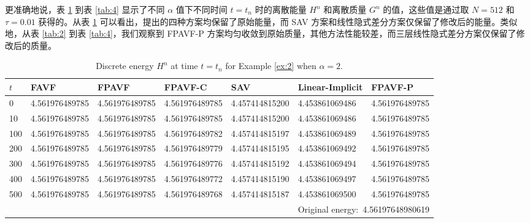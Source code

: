 	更准确地说，表 \ref{tab:1} 到表 \ref{tab:4} 显示了不同 $\alpha$ 值下不同时间 $t=t_n$ 时的离散能量 $H^n$ 和离散质量 $G^n$ 的值，这些值是通过取 $N=512$ 和 $\tau=0.01$ 获得的。从表 \ref{tab:1} 可以看出，提出的四种方案均保留了原始能量，而 SAV 方案和线性隐式差分方案仅保留了修改后的能量。类似地，从表 \ref{tab:2} 到表 \ref{tab:4}，我们观察到 FPAVF-P 方案均匀收敛到原始质量，其他方法性能较差，而三层线性隐式差分方案仅保留了修改后的质量。

	
\begin{table}[H]\small
	\centering
	\caption{Discrete energy $H^n$ at time $t=t_n$ for Example \ref{ex:2} when $\alpha=2$.}
	  \begin{tabular}{lllllll}
	  \toprule
       $t$   &FAVF   &FPAVF   &FPAVF-C   &SAV    &Linear-Implicit   &FPAVF-P\\
	  \midrule
	  0     &4.561976489785   &4.561976489785   &4.561976489785   &4.457414815200   &4.453861069486   &4.561976489785 \\
	  10    &4.561976489785   &4.561976489785   &4.561976489785   &4.457414815200   &4.453861069486   &4.561976489785 \\
	  100   &4.561976489785   &4.561976489785   &4.561976489782   &4.457414815197   &4.453861069489   &4.561976489785 \\
	  200   &4.561976489785   &4.561976489785   &4.561976489779   &4.457414815195   &4.453861069492   &4.561976489785 \\
	  300   &4.561976489785   &4.561976489785   &4.561976489776   &4.457414815192   &4.453861069494   &4.561976489785 \\
	  400   &4.561976489785   &4.561976489785   &4.561976489772   &4.457414815190   &4.453861069497   &4.561976489785 \\
	  500   &4.561976489785   &4.561976489785   &4.561976489768   &4.457414815187   &4.453861069500   &4.561976489785 \\
	  \midrule
	  \multicolumn{7}{r}{Original energy:~4.56197648980619} \\
	  \bottomrule
	  \end{tabular}\label{tab:1}%
  \end{table}%


